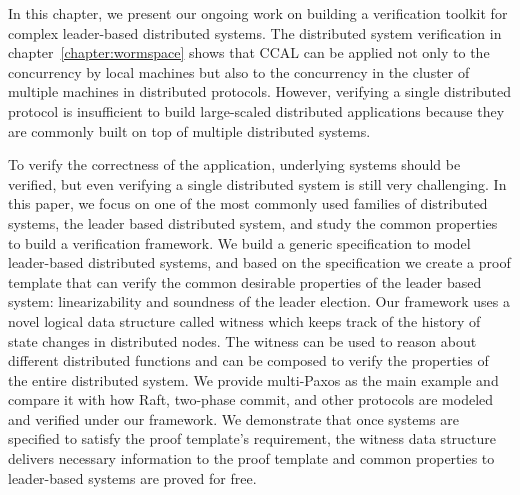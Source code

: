 In this chapter, we present our ongoing work on building a verification toolkit for complex leader-based distributed systems. 
The distributed system verification in chapter~\ref{chapter:wormspace} shows 
that CCAL can be applied not only to the concurrency by local machines
but also to the concurrency in the cluster of multiple machines in distributed protocols. 
However, verifying a single distributed protocol is insufficient to build large-scaled distributed applications 
because they are commonly built on top of multiple distributed systems.

To verify the correctness of the application, underlying
systems should be verified, but even verifying a single distributed system is
still very challenging. In this paper, we focus on one of the most commonly
used families of distributed systems, the leader based distributed system, and study the common properties to build a verification framework.
We build a generic specification to model leader-based distributed systems, and based on
the specification we create a proof template that can verify the common
desirable properties of the leader based system: linearizability and soundness of
the leader election. 
Our framework uses a novel logical data structure called witness which keeps track of the history of state changes in distributed nodes.
The witness can be used to reason about different distributed functions and can
be composed to verify the properties of the entire distributed system. We provide
multi-Paxos as the main example and compare it with
how Raft, two-phase commit, and other protocols are modeled and verified under
our framework. 
We demonstrate that once systems are specified to satisfy the proof template's requirement, the witness data structure delivers necessary
information to the proof template and common properties to leader-based systems are proved for free. 


